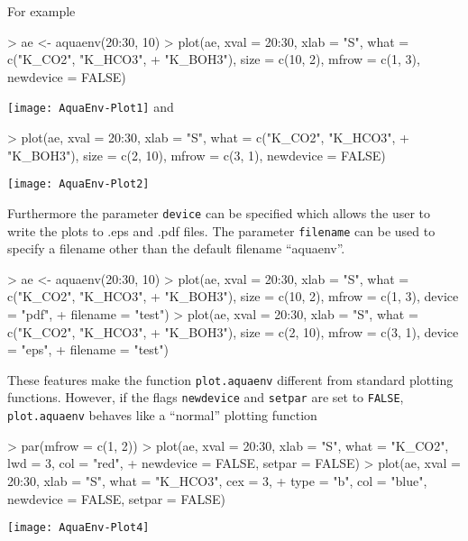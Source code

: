 \documentclass[article,nojss]{jss}
\newcommand{\R}{\proglang{R }}
\begin{document}
\noindent
For example
\begin{Schunk}
\begin{Sinput}
> ae <- aquaenv(20:30, 10)
> plot(ae, xval = 20:30, xlab = "S", what = c("K_CO2", "K_HCO3", 
+     "K_BOH3"), size = c(10, 2), mfrow = c(1, 3), newdevice = FALSE)
\end{Sinput}
\end{Schunk}
\texttt{[image: AquaEnv-Plot1]}
and
\begin{Schunk}
\begin{Sinput}
> plot(ae, xval = 20:30, xlab = "S", what = c("K_CO2", "K_HCO3", 
+     "K_BOH3"), size = c(2, 10), mfrow = c(3, 1), newdevice = FALSE)
\end{Sinput}
\end{Schunk}
\texttt{[image: AquaEnv-Plot2]}

Furthermore the parameter \texttt{device} can be specified which allows the user to write the plots to .eps and .pdf files.
The parameter \texttt{filename} can be used to specify a filename other than the default filename ``aquaenv''.

\begin{Schunk}
\begin{Sinput}
> ae <- aquaenv(20:30, 10)
> plot(ae, xval = 20:30, xlab = "S", what = c("K_CO2", "K_HCO3", 
+     "K_BOH3"), size = c(10, 2), mfrow = c(1, 3), device = "pdf", 
+     filename = "test")
> plot(ae, xval = 20:30, xlab = "S", what = c("K_CO2", "K_HCO3", 
+     "K_BOH3"), size = c(2, 10), mfrow = c(3, 1), device = "eps", 
+     filename = "test")
\end{Sinput}
\end{Schunk}

These features make the function \texttt{plot.aquaenv} different from standard \R plotting functions.
However, if the flags \texttt{newdevice} and \texttt{setpar} are set to \texttt{FALSE}, \texttt{plot.aquaenv} behaves like a ``normal'' \R plotting function

\begin{Schunk}
\begin{Sinput}
> par(mfrow = c(1, 2))
> plot(ae, xval = 20:30, xlab = "S", what = "K_CO2", lwd = 3, col = "red", 
+     newdevice = FALSE, setpar = FALSE)
> plot(ae, xval = 20:30, xlab = "S", what = "K_HCO3", cex = 3, 
+     type = "b", col = "blue", newdevice = FALSE, setpar = FALSE)
\end{Sinput}
\end{Schunk}
\texttt{[image: AquaEnv-Plot4]}
\end{document}
